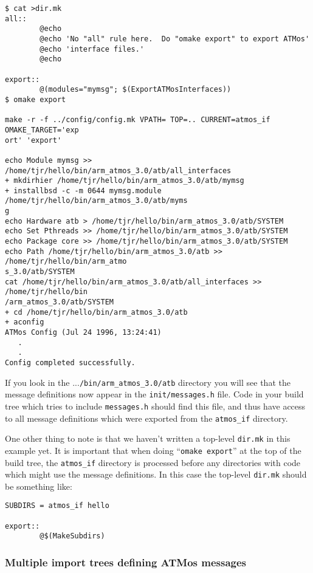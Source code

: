 \documentclass[11pt,twoside,onecolumn]{article}
\begin{document}
{\footnotesize \begin{verbatim}
$ cat >dir.mk
all::
        @echo
        @echo 'No "all" rule here.  Do "omake export" to export ATMos'
        @echo 'interface files.'
        @echo

export::
        @(modules="mymsg"; $(ExportATMosInterfaces))
$ omake export

make -r -f ../config/config.mk VPATH= TOP=.. CURRENT=atmos_if OMAKE_TARGET='exp
ort' 'export'

echo Module mymsg >> /home/tjr/hello/bin/arm_atmos_3.0/atb/all_interfaces
+ mkdirhier /home/tjr/hello/bin/arm_atmos_3.0/atb/mymsg 
+ installbsd -c -m 0644 mymsg.module /home/tjr/hello/bin/arm_atmos_3.0/atb/myms
g 
echo Hardware atb > /home/tjr/hello/bin/arm_atmos_3.0/atb/SYSTEM
echo Set Pthreads >> /home/tjr/hello/bin/arm_atmos_3.0/atb/SYSTEM
echo Package core >> /home/tjr/hello/bin/arm_atmos_3.0/atb/SYSTEM
echo Path /home/tjr/hello/bin/arm_atmos_3.0/atb >> /home/tjr/hello/bin/arm_atmo
s_3.0/atb/SYSTEM
cat /home/tjr/hello/bin/arm_atmos_3.0/atb/all_interfaces >> /home/tjr/hello/bin
/arm_atmos_3.0/atb/SYSTEM
+ cd /home/tjr/hello/bin/arm_atmos_3.0/atb 
+ aconfig 
ATMos Config (Jul 24 1996, 13:24:41)
   .
   .
Config completed successfully.
\end{verbatim}}

If you look in the ...\verb|/bin/arm_atmos_3.0/atb| directory you will see that
the message definitions now appear in the \verb|init/messages.h| file.  Code in
your build tree which tries to include \verb|messages.h| should find this file,
and thus have access to all message definitions which were exported from the
\verb|atmos_if| directory.

One other thing to note is that we haven't written a top-level {\tt dir.mk} in
this example yet.  It is important that when doing ``{\tt omake export}'' at
the top of the build tree, the \verb|atmos_if| directory is processed before
any directories with code which might use the message definitions.  In this
case the top-level {\tt dir.mk} should be something like:

{\footnotesize \begin{verbatim}
SUBDIRS = atmos_if hello

export::
        @$(MakeSubdirs)
\end{verbatim}}

\subsubsection{Multiple import trees defining ATMos messages}
\end{document}
